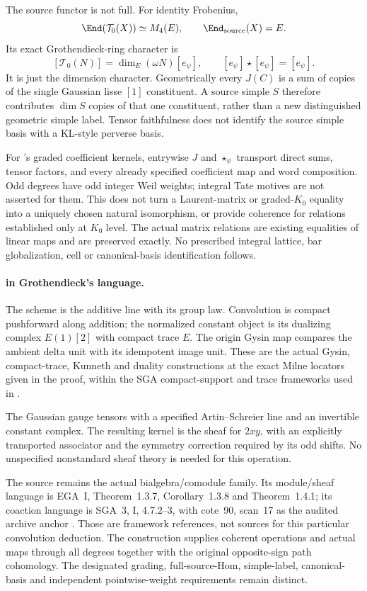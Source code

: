 The source functor is not full. For identity Frobenius,
\[
 \End(\mathcal T_0(X))\simeq M_4(E),\qquad
 \End_{\mathrm{source}}(X)=E.
\]
Its exact Grothendieck-ring character is
\[
 [\mathcal T_0(N)]=\dim_E(\omega N)[e_\psi],
 \qquad [e_\psi]\star[e_\psi]=[e_\psi].
\]
It is just the dimension character.
Geometrically every $J(C)$ is a sum of copies of the
single Gaussian lisse $[1]$ constituent.
A source simple $S$ therefore contributes $\dim S$
copies of that one constituent, rather than a new
distinguished geometric simple label.
Tensor faithfulness does not identify the source
simple basis with a KL-style perverse basis.

For 's graded coefficient kernels, entrywise
$J$ and $\star_\psi$ transport direct sums, tensor
factors, and every already specified coefficient
map and word composition.
Odd degrees have odd integer Weil weights; integral
Tate motives are not asserted for them.
This does not turn a Laurent-matrix or graded-$K_0$
equality into a uniquely chosen natural isomorphism,
or provide coherence for relations established only
at $K_0$ level. The actual  matrix relations
are existing equalities of linear maps and are
preserved exactly.
No prescribed integral lattice, bar globalization,
cell or canonical-basis identification follows.

\paragraph{ in Grothendieck's language.}
The scheme is the additive line with its group law.
Convolution is compact pushforward along addition;
the normalized constant object is its dualizing
complex $E(1)[2]$ with compact trace $E$.
The origin Gysin map compares the ambient delta unit
with its idempotent image unit.
These are the actual Gysin, compact-trace, Kunneth
and duality constructions at the exact Milne locators
given in the proof, within the SGA compact-support
and trace frameworks used in .

The Gaussian gauge tensors with a specified
Artin--Schreier line and an invertible constant
complex. The resulting kernel is the sheaf for
$2xy$, with an explicitly transported associator
and the symmetry correction required by its odd
shifts. No unspecified nonstandard sheaf theory
is needed for this operation.

The source remains the actual bialgebra/comodule
family. Its module/sheaf language is EGA~I,
Theorem~1.3.7, Corollary~1.3.8 and Theorem~1.4.1;
its coaction language is SGA~3, I, 4.7.2--3,
with cote~90, scan~17 as the audited archive anchor
\cite{EGA,SGA3,Archive}.
Those are framework references, not sources for
this particular convolution deduction.
The construction supplies coherent operations and
actual maps through all degrees together with the
original opposite-sign path cohomology.
The designated grading, full-source-Hom, simple-label,
canonical-basis and independent pointwise-weight
requirements remain distinct.


